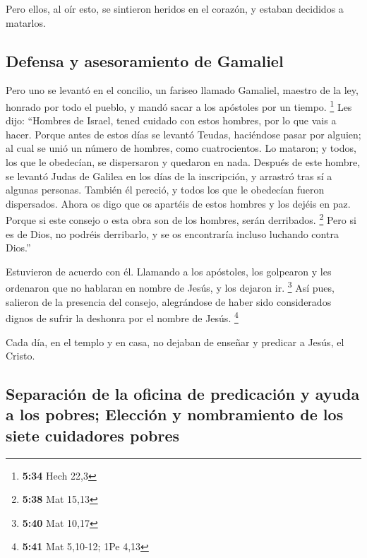  Pero ellos, al oír esto, se sintieron heridos en el
corazón, y estaban decididos a matarlos.

\hypertarget{defensa-y-asesoramiento-de-gamaliel}{%
\subsection{Defensa y asesoramiento de
Gamaliel}\label{defensa-y-asesoramiento-de-gamaliel}}

 Pero uno se levantó en el concilio, un fariseo llamado
Gamaliel, maestro de la ley, honrado por todo el pueblo, y mandó sacar a
los apóstoles por un tiempo. \footnote{\textbf{5:34} Hech 22,3}
 Les dijo: ``Hombres de Israel, tened cuidado con estos
hombres, por lo que vais a hacer.  Porque antes de estos
días se levantó Teudas, haciéndose pasar por alguien; al cual se unió un
número de hombres, como cuatrocientos. Lo mataron; y todos, los que le
obedecían, se dispersaron y quedaron en nada.  Después de
este hombre, se levantó Judas de Galilea en los días de la inscripción,
y arrastró tras sí a algunas personas. También él pereció, y todos los
que le obedecían fueron dispersados.  Ahora os digo que
os apartéis de estos hombres y los dejéis en paz. Porque si este consejo
o esta obra son de los hombres, serán derribados. \footnote{\textbf{5:38}
  Mat 15,13}  Pero si es de Dios, no podréis derribarlo,
y se os encontraría incluso luchando contra Dios.''

 Estuvieron de acuerdo con él. Llamando a los apóstoles,
los golpearon y les ordenaron que no hablaran en nombre de Jesús, y los
dejaron ir. \footnote{\textbf{5:40} Mat 10,17}  Así pues,
salieron de la presencia del consejo, alegrándose de haber sido
considerados dignos de sufrir la deshonra por el nombre de Jesús.
\footnote{\textbf{5:41} Mat 5,10-12; 1Pe 4,13}

 Cada día, en el templo y en casa, no dejaban de enseñar
y predicar a Jesús, el Cristo.

\hypertarget{separaciuxf3n-de-la-oficina-de-predicaciuxf3n-y-ayuda-a-los-pobres-elecciuxf3n-y-nombramiento-de-los-siete-cuidadores-pobres}{%
\subsection{Separación de la oficina de predicación y ayuda a los
pobres; Elección y nombramiento de los siete cuidadores
pobres}\label{separaciuxf3n-de-la-oficina-de-predicaciuxf3n-y-ayuda-a-los-pobres-elecciuxf3n-y-nombramiento-de-los-siete-cuidadores-pobres}}

